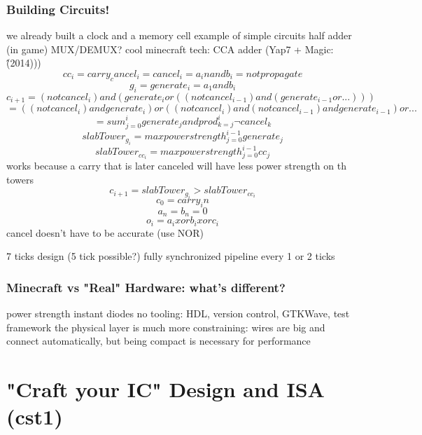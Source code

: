 \documentclass[aspectratio=169]{beamer}
\begin{document}
\begin{frame}
	\frametitle{Building Circuits!}
	we already built a clock and a memory cell
	example of simple circuits
	half adder (in game)
	MUX/DEMUX?
	cool minecraft tech: CCA adder (Yap7 + Magic:\^ (2014)))
	$$cc_i = carry_cancel_i = cancel_i = a_i nand b_i = not propagate$$
	$$g_i = generate_i = a_1 and b_i$$
	$$c_{i+1} = (not cancel_i) and (generate_i or ((not cancel_{i-1}) and (generate_{i-1} or ...)))$$
	$$= ((not cancel_i) and generate_i) or ((not cancel_i) and (not cancel_{i-1}) and generate_{i-1}) or ...$$
	$$= sum_{j=0}^{i} generate_{j} and prod_{k=j}^{i} ¬cancel_k$$
	$$slabTower_{g_i} = max power strength_{j=0}^{i-1} generate_j$$
	$$slabTower_{cc_i} = max power strength_{j=0}^{i-1} cc_j$$
	works because a carry that is later canceled will have less power strength on th towers
	$$c_{i+1} = slabTower_{g_i} > slabTower_{cc_i}$$
	$$c_0 = carry_in$$
	$$a_n = b_n = 0$$
	$$o_i = a_i xor b_i xor c_i$$
	cancel doesn't have to be accurate (use NOR)

	7 ticks design (5 tick possible?)
	fully synchronized
	pipeline every 1 or 2 ticks
\end{frame}

\begin{frame}
	\frametitle{Minecraft vs "Real" Hardware: what's different?}
	power strength
	instant diodes
	no tooling: HDL, version control, GTKWave, test framework
	the physical layer is much more constraining: wires are big and connect automatically, but being compact is necessary for performance
\end{frame}

\section{"Craft your IC" Design and ISA (cst1)}

\end{document}
